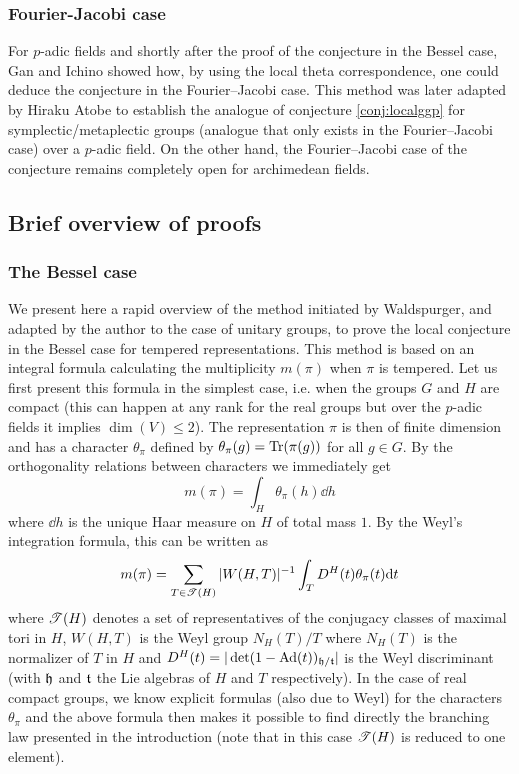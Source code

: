 \subsubsection{Fourier-Jacobi case}

For $p$-adic fields and shortly after the proof of the conjecture in the Bessel case, Gan and Ichino \cite{gan2016gross} showed how, by using the local theta correspondence, one could deduce the conjecture in the Fourier--Jacobi case.
This method was later adapted by Hiraku Atobe \cite{atobe2018local} to establish the analogue of conjecture \ref{conj:localggp} for symplectic/metaplectic groups (analogue that only exists in the Fourier--Jacobi case) over a $p$-adic field.
On the other hand, the Fourier--Jacobi case of the conjecture remains completely open for archimedean fields.


\subsection{Brief overview of proofs}

\subsubsection{The Bessel case}

We present here a rapid overview of the method initiated by Waldspurger, and adapted by the author to the case of unitary groups, to prove the local conjecture in the Bessel case for tempered representations.
This method is based on an integral formula calculating the multiplicity $m(\pi)$ when $\pi$ is tempered.
Let us first present this formula in the simplest case, i.e. when the groups $G$ and $H$ are compact (this can happen at any rank for the real groups but over the $p$-adic fields it implies $\dim(V) \leq 2$).
The representation $\pi$ is then of finite dimension and has a character $\theta_\pi$ defined by $\theta_\pi(g) = \mathrm{Tr}(\pi(g))$ for all $g \in G$.
By the orthogonality relations between characters we immediately get
\[
    m(\pi) = \int_H \theta_\pi(h) \dd h
\]
where $\dd h$ is the unique Haar measure on $H$ of total mass $1$.
By the Weyl's integration formula, this can be written as
\begin{equation}
\label{eqn:4}
    m(\pi) = \sum_{T \in \mathscr{T}(H)} |W(H, T)|^{-1} \int_T D^H(t) \theta_\pi(t) \mathrm{d} t
\end{equation}
where $\mathscr{T}(H)$ denotes a set of representatives of the conjugacy classes of maximal tori in $H$, $W(H, T)$ is the Weyl group $N_H(T) / T$ where $N_H(T)$ is the normalizer of $T$ in $H$ and $D^H(t) = |\det(1 - \mathrm{Ad}(t))_{\mathfrak{h} / \mathfrak{t}}|$ is the Weyl discriminant (with $\mathfrak{h}$ and $\mathfrak{t}$ the Lie algebras of $H$ and $T$ respectively).
In the case of real compact groups, we know explicit formulas (also due to Weyl) for the characters $\theta_\pi$ and the above formula then makes it possible to find directly the branching law presented in the introduction (note that in this case $\mathscr{T}(H)$ is reduced to one element).

